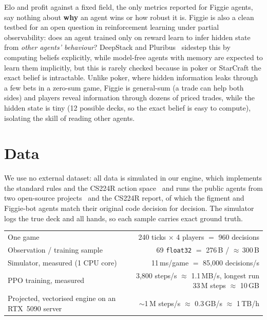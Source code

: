 \documentclass{article}
\begin{document}
Elo and profit against a fixed field, the only metrics reported for Figgie agents, say nothing about \textbf{why} an agent wins or how robust it is.
Figgie is also a clean testbed for an open question in reinforcement learning under partial observability: does an agent trained only on reward learn to infer hidden state from \emph{other agents' behaviour}? DeepStack and Pluribus~\cite{pluribus} sidestep this by computing beliefs explicitly, while model-free agents with memory are expected to learn them implicitly, but this is rarely checked because in poker or StarCraft the exact belief is intractable. Unlike poker, where hidden information leaks through a few bets in a zero-sum game, Figgie is general-sum (a trade can help both sides) and players reveal information through dozens of priced trades, while the hidden state is tiny (12 possible decks, so the exact belief is easy to compute), isolating the skill of reading other agents. 

\section{Data}
We use no external dataset: all data is simulated in our engine, which implements the standard rules and the CS224R action space~\cite{cs224r} and runs the public agents from two open-source projects~\cite{figment,figgiebot} and the CS224R report, of which the figment and Figgie-bot agents match their original code decision for decision. The simulator logs the true deck and all hands, so each sample carries exact ground truth.

\begin{center}
\begin{tabular}{@{}lr@{}}
\toprule
One game & 240 ticks $\times$ 4 players $=$ 960 decisions \\
Observation / training sample & 69 \texttt{float32} $=$ 276\,B / $\approx$\,300\,B \\
Simulator, measured (1 CPU core) & 11\,ms/game $=$ 85{,}000 decisions/s \\
PPO training, measured & 3{,}800 steps/s $\approx$ 1.1\,MB/s, longest run 33\,M steps $\approx$ 10\,GB \\
Projected, vectorised engine on an RTX~5090 server & $\sim$1\,M steps/s $\approx$ 0.3\,GB/s $\approx$ 1\,TB/h \\
\bottomrule
\end{tabular}
\end{center}
\end{document}

